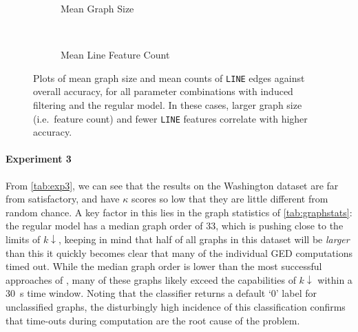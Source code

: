 \documentclass{mpaper}
\begin{document}
\begin{figure}
	\centering	
	
	\begin{subfigure}[t]{0.45\linewidth}
		
		\caption{Mean Graph Size}
	\end{subfigure}
	~
	\begin{subfigure}[t]{0.45\linewidth}
		
		\caption{Mean Line Feature Count}
	\end{subfigure}
	
	\vspace{0.5em}
	\caption{
		Plots of mean graph size and mean counts of \texttt{LINE} edges against overall accuracy, for all parameter combinations with induced filtering and the regular model.
		In these cases, larger graph size (i.e.\ feature count) and fewer \texttt{LINE} features correlate with higher accuracy.
		\label{fig:acc-vs-graphstat}
	}
\end{figure}

\paragraph{Experiment 3}
From \cref{tab:exp3}, we can see that the results on the Washington dataset are far from satisfactory, and have $\kappa$ scores so low that they are little different from random chance.
A key factor in this lies in the graph statistics of \cref{tab:graphstats}: the regular model has a median graph order of 33, which is pushing close to the limits of $k\downarrow$, keeping in mind that half of all graphs in this dataset will be \emph{larger} than this it quickly becomes clear that many of the individual GED computations timed out.
While the median graph order is lower than the most successful approaches of \citeauthor{Graphs-Handwriting}, many of these graphs likely exceed the capabilities of $k\downarrow$ within a \SI{30}{\second} time window.
Noting that the classifier returns a default `0' label for unclassified graphs, the disturbingly high incidence of this classification confirms that time-outs during computation are the root cause of the problem.
\end{document}
